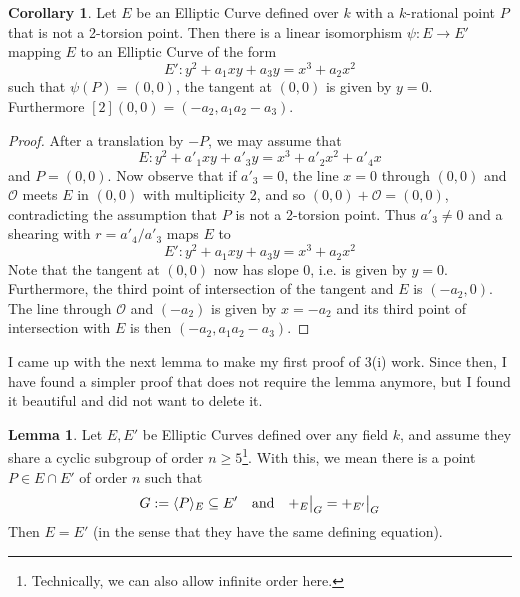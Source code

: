 \documentclass{scrartcl}
\renewcommand{\O}{\mathcal{O}}
\newcommand\restr[2]{{
    \left.\kern-\nulldelimiterspace
    #1
    \vphantom{\big|}
    \right|_{#2}
}}
\theoremstyle{definition}
\newtheorem{lemma}[subsection]{Lemma}
\newtheorem{corollary}[subsection]{Corollary}
\begin{document}
\begin{corollary}
    \label{prop:point_normalization}
    Let $E$ be an Elliptic Curve defined over $k$ with a $k$-rational point $P$ that is not a 2-torsion point.
    Then there is a linear isomorphism $\psi: E \to E'$ mapping $E$ to an Elliptic Curve of the form
    \begin{equation*}
        E': y^2 + a_1 x y + a_3 y = x^3 + a_2 x^2
    \end{equation*}
    such that $\psi(P) = (0, 0)$, the tangent at $(0, 0)$ is given by $y = 0$.
    Furthermore $[2](0, 0) = (-a_2, a_1 a_2 - a_3)$.
\end{corollary}
\begin{proof}
    After a translation by $-P$, we may assume that
    \begin{equation*}
        E: y^2 + a'_1 x y + a'_3 y = x^3 + a'_2 x^2 + a'_4 x
    \end{equation*}
    and $P = (0, 0)$.
    Now observe that if $a'_3 = 0$, the line $x = 0$ through $(0, 0)$ and $\O$ meets $E$ in $(0, 0)$ with multiplicity 2, and so $(0, 0) + \O = (0, 0)$, contradicting the assumption that $P$ is not a 2-torsion point.
    Thus $a'_3 \neq 0$ and a shearing with $r = a'_4 / a'_3$ maps $E$ to
    \begin{equation*}
        E': y^2 + a_1 x y + a_3 y = x^3 + a_2 x^2
    \end{equation*}
    Note that the tangent at $(0, 0)$ now has slope $0$, i.e. is given by $y = 0$.
    Furthermore, the third point of intersection of the tangent and $E$ is $(-a_2, 0)$.
    The line through $\O$ and $(-a_2)$ is given by $x = -a_2$ and its third point of intersection with $E$ is then $(-a_2, a_1a_2 - a_3)$. 
\end{proof}
I came up with the next lemma to make my first proof of 3(i) work.
Since then, I have found a simpler proof that does not require the lemma anymore, but I found it beautiful and did not want to delete it.
\begin{lemma}
    \label{prop:share_subgroup_equal}
    Let $E, E'$ be Elliptic Curves defined over any field $k$, and assume they share a cyclic subgroup of order $n \geq 5$\footnote{Technically, we can also allow infinite order here.}.
    With this, we mean there is a point $P \in E \cap E'$ of order $n$ such that
    \begin{equation*}
        G := \langle P \rangle_E \subseteq E' \quad \text{and} \quad \restr{+_E}{G} = \restr{+_{E'}}{G}
    \end{equation*}
    Then $E = E'$ (in the sense that they have the same defining equation).
\end{lemma}
\end{document}
